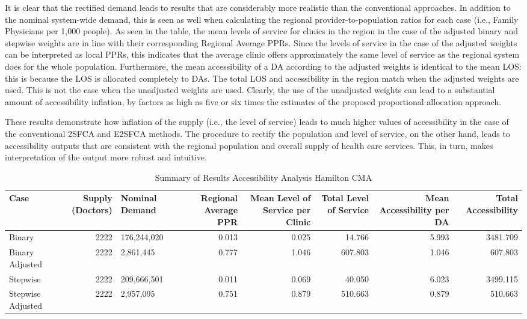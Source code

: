 \documentclass[10pt,letterpaper]{article}
\begin{document}
It is clear that the rectified demand leads to results that are
considerably more realistic than the conventional approaches. In
addition to the nominal system-wide demand, this is seen as well when
calculating the regional provider-to-population ratios for each case
(i.e., Family Physicians per 1,000 people). As seen in the table, the
mean levels of service for clinics in the region in the case of the
adjusted binary and stepwise weights are in line with their
corresponding Regional Average PPRs. Since the levels of service in the
case of the adjusted weights can be interpreted as local PPRs, this
indicates that the average clinic offers approximately the same level of
service as the regional system does for the whole population.
Furthermore, the mean accessibility of a DA according to the adjusted
weights is identical to the mean LOS: this is because the LOS is
allocated completely to DAs. The total LOS and accessibility in the
region match when the adjusted weights are used. This is not the case
when the unadjusted weights are used. Clearly, the use of the unadjusted
weights can lead to a substantial amount of accessibility inflation, by
factors as high as five or six times the estimates of the proposed
proportional allocation approach.

These results demonstrate how inflation of the supply (i.e., the level
of service) leads to much higher values of accessibility in the case of
the conventional 2SFCA and E2SFCA methods. The procedure to rectify the
population and level of service, on the other hand, leads to
accessibility outputs that are consistent with the regional population
and overall supply of health care services. This, in turn, makes
interpretation of the output more robust and intuitive.

\begin{landscape}\begin{table}[t]

\caption{\label{tab:table-descriptive-statistics}\label{tab:table-descriptive-statistics}Summary of Results Accessibility Analysis Hamilton CMA}
\centering
\fontsize{7}{9}\selectfont
\begin{tabular}{lrlrrrrr}
\toprule
Case & Supply (Doctors) & Nominal Demand & Regional Average PPR & Mean Level of Service per Clinic & Total Level of Service & Mean Accessibility per DA & Total Accessibility\\
\midrule
Binary & 2222 & 176,244,020 & 0.013 & 0.025 & 14.766 & 5.993 & 3481.709\\
Binary Adjusted & 2222 & 2,861,445 & 0.777 & 1.046 & 607.803 & 1.046 & 607.803\\
Stepwise & 2222 & 209,666,501 & 0.011 & 0.069 & 40.050 & 6.023 & 3499.115\\
Stepwise Adjusted & 2222 & 2,957,095 & 0.751 & 0.879 & 510.663 & 0.879 & 510.663\\
\bottomrule
\end{tabular}
\end{table}
\end{landscape}
\end{document}
